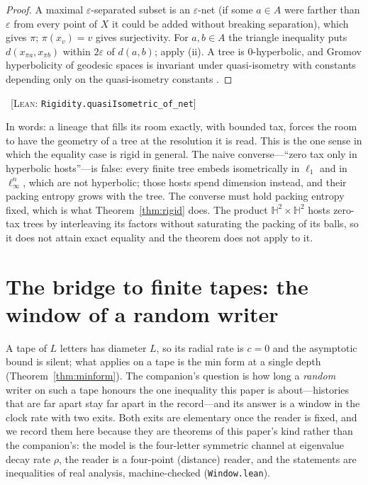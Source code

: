 \documentclass[11pt,reqno]{amsart}
\theoremstyle{plain}
\theoremstyle{definition}
\newcommand{\Htwo}{\mathbb{H}^2}
\newcommand{\eps}{\varepsilon}
\newcommand{\cert}[1]{{\footnotesize\ [\textsc{Lean}: \texttt{#1}]}}
\begin{document}
\begin{proof}
A maximal $\eps$-separated subset is an $\eps$-net (if some $a\in A$ were farther than $\eps$ from every point of $X$ it could be added without breaking separation), which gives $\pi$; $\pi(x_v)=v$ gives surjectivity. For $a,b\in A$ the triangle inequality puts $d(x_{\pi a},x_{\pi b})$ within $2\eps$ of $d(a,b)$; apply (ii). A tree is $0$-hyperbolic, and Gromov hyperbolicity of geodesic spaces is invariant under quasi-isometry with constants depending only on the quasi-isometry constants \cite{gromov1987}.
\end{proof}\cert{Rigidity.quasiIsometric\_\allowbreak{}of\_\allowbreak{}net}

In words: a lineage that fills its room exactly, with bounded tax, forces the room to have the geometry of a tree at the resolution it is read. This is the one sense in which the equality case is rigid in general. The naive converse---``zero tax only in hyperbolic hosts''---is false: every finite tree embeds isometrically in $\ell_1$ and in $\ell_\infty^n$, which are not hyperbolic; those hosts spend dimension instead, and their packing entropy grows with the tree. The converse must hold packing entropy fixed, which is what Theorem~\ref{thm:rigid} does. The product $\Htwo\times\Htwo$ hosts zero-tax trees by interleaving its factors without saturating the packing of its balls, so it does not attain exact equality and the theorem does not apply to it.

\section{The bridge to finite tapes: the window of a random writer}\label{sec:window}

A tape of $L$ letters has diameter $L$, so its radial rate is $c=0$ and the asymptotic bound is silent; what applies on a tape is the min form at a single depth (Theorem~\ref{thm:minform}). The companion's question is how long a \emph{random} writer on such a tape honours the one inequality this paper is about---histories that are far apart stay far apart in the record---and its answer is a window in the clock rate with two exits. Both exits are elementary once the reader is fixed, and we record them here because they are theorems of this paper's kind rather than the companion's: the model is the four-letter symmetric channel at eigenvalue decay rate $\rho$, the reader is a four-point (distance) reader, and the statements are inequalities of real analysis, machine-checked (\texttt{Window.lean}).
\end{document}
